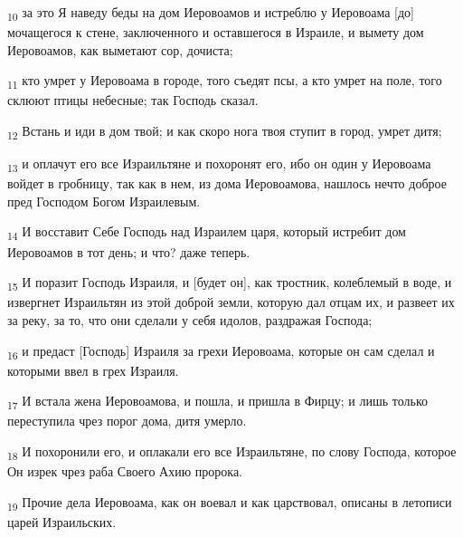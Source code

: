 \begin{tcolorbox}
\textsubscript{10} за это Я наведу беды на дом Иеровоамов и истреблю у Иеровоама [до] мочащегося к стене, заключенного и оставшегося в Израиле, и вымету дом Иеровоамов, как выметают сор, дочиста;
\end{tcolorbox}
\begin{tcolorbox}
\textsubscript{11} кто умрет у Иеровоама в городе, того съедят псы, а кто умрет на поле, того склюют птицы небесные; так Господь сказал.
\end{tcolorbox}
\begin{tcolorbox}
\textsubscript{12} Встань и иди в дом твой; и как скоро нога твоя ступит в город, умрет дитя;
\end{tcolorbox}
\begin{tcolorbox}
\textsubscript{13} и оплачут его все Израильтяне и похоронят его, ибо он один у Иеровоама войдет в гробницу, так как в нем, из дома Иеровоамова, нашлось нечто доброе пред Господом Богом Израилевым.
\end{tcolorbox}
\begin{tcolorbox}
\textsubscript{14} И восставит Себе Господь над Израилем царя, который истребит дом Иеровоамов в тот день; и что? даже теперь.
\end{tcolorbox}
\begin{tcolorbox}
\textsubscript{15} И поразит Господь Израиля, и [будет он], как тростник, колеблемый в воде, и извергнет Израильтян из этой доброй земли, которую дал отцам их, и развеет их за реку, за то, что они сделали у себя идолов, раздражая Господа;
\end{tcolorbox}
\begin{tcolorbox}
\textsubscript{16} и предаст [Господь] Израиля за грехи Иеровоама, которые он сам сделал и которыми ввел в грех Израиля.
\end{tcolorbox}
\begin{tcolorbox}
\textsubscript{17} И встала жена Иеровоамова, и пошла, и пришла в Фирцу; и лишь только переступила чрез порог дома, дитя умерло.
\end{tcolorbox}
\begin{tcolorbox}
\textsubscript{18} И похоронили его, и оплакали его все Израильтяне, по слову Господа, которое Он изрек чрез раба Своего Ахию пророка.
\end{tcolorbox}
\begin{tcolorbox}
\textsubscript{19} Прочие дела Иеровоама, как он воевал и как царствовал, описаны в летописи царей Израильских.
\end{tcolorbox}
